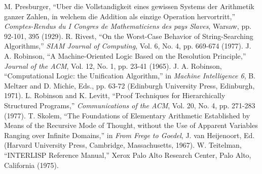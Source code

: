 \documentclass[10pt]{book}
\begin{document}
\begin{thebibliography}{99}
 M. Presburger, ``Uber die Vollstandigkeit eines gewissen Systems der Arithmetik ganzer Zahlen, in welchem die Addition als einzige Operation hervortritt,'' \emph{Comptes-Rendus du I Congres de Mathematiciens des pays Slaves}, Warsaw, pp. 92-101, 395 (1929).
 R. Rivest, ``On the Worst-Case Behavior of String-Searching Algorithms,'' \emph{SIAM Journal of Computing}, Vol. 6, No. 4, pp. 669-674 (1977).
 J. A. Robinson, ``A Machine-Oriented Logic Based on the Resolution Principle,'' \emph{Journal of the ACM}, Vol. 12, No. 1, pp. 23-41 (1965).
 J. A. Robinson, ``Computational Logic: the Unification Algorithm,'' in \emph{Machine Intelligence 6},  B. Meltzer and D. Michie, Eds., pp. 63-72 (Edinburgh University Press, Edinburgh, 1971).
 L. Robinson and K. Levitt, ``Proof Techniques for Hierarchically Structured Programs,'' \emph{Communications of the ACM}, Vol. 20, No. 4, pp. 271-283 (1977).
 T. Skolem, ``The Foundations of Elementary Arithmetic Established by Means of the Recursive Mode of Thought, without the Use of Apparent Variables Ranging over Infinite Domains,'' in \emph{From Frege to Goedel},  J. van Heijenoort, Ed. (Harvard University Press, Cambridge, Massachusetts, 1967).
 W. Teitelman, ``INTERLISP Reference Manual,'' Xerox Palo Alto Research Center, Palo Alto, California (1975).
\end{thebibliography}
\end{document}
